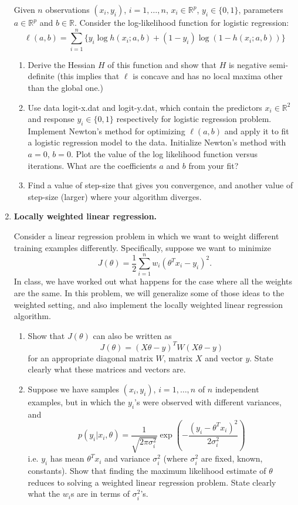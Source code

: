 \documentclass[11pt]{article}
\begin{document}
\begin{enumerate}
Given $n$ observations $(x_i, y_i)$, $i = 1, \ldots, n$, $x_i \in \mathbb{R}^p$, $y_i \in \{0, 1\}$, parameters $a \in \mathbb{R}^p$ and $b \in \mathbb{R}$. Consider the log-likelihood function for logistic regression:
\[
\ell(a, b) = \sum_{i=1}^n \{y_i \log h(x_i; a, b) + (1-y_i) \log (1-h(x_i; a, b))\}
\]
\begin{enumerate}
\item
Derive the Hessian $H$ of this function and show that $H$ is negative semi-definite (this implies that $\ell$ is concave and has no local maxima other than the global one.)
\item Use data \textsf{logit-x.dat} and \textsf{logit-y.dat}, which contain the predictors $x_i \in \mathbb{R}^2$ and response $y_i \in\{0, 1\}$ respectively for logistic regression problem. Implement Newton's method for optimizing $\ell(a, b)$ and apply it to fit a logistic regression model to the data. Initialize Newton's method with $a = 0$, $b = 0$. Plot the value of the log likelihood function versus iterations.
What are the coefficients $a$ and $b$ from your fit?
\item Find a value of step-size that gives you convergence, and another value of step-size (larger) where your algorithm diverges. 

\end{enumerate}


\item {\bf Locally weighted linear regression.}

Consider a linear regression problem in which we want to weight different training examples differently. Specifically, suppose we want to minimize
\[
J(\theta) = \frac{1}{2}\sum_{i=1}^n w_i (\theta^T x_i - y_i)^2.
\]
In class, we have worked out what happens for the case where all the weights are the same. In this problem, we will generalize some of those ideas to the weighted setting, and also implement the locally weighted linear regression algorithm.

\begin{enumerate}
\item Show that $J(\theta)$ can also be written as
\[
J(\theta) = (X \theta - y)^T W (X\theta - y)
\]
for an appropriate diagonal matrix $W$, matrix $X$ and vector $y$. State clearly what these matrices and vectors are.

\item Suppose we have samples $(x_i, y_i)$, $i = 1, \ldots, n$ of $n$ independent examples, but in which the $y_i$'s were observed with different variances, and 
\[
p(y_i|x_i, \theta) = \frac{1}{\sqrt{2\pi\sigma_i^2}} 
\exp(-\frac{(y_i -\theta^T x_i)^2}{2\sigma_i^2})
\]
i.e. $y_i$ has mean $\theta^T x_i$ and variance $\sigma_i^2$ (where $\sigma_i^2$ are fixed, known, constants). Show that finding the maximum likelihood estimate of $\theta$ reduces to solving a weighted linear regression problem. State clearly what the $w_i$s are in terms of $\sigma_i^2$'s.


\end{enumerate}
\end{enumerate}
\end{document}
